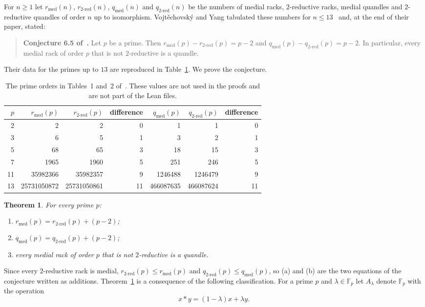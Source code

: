 \documentclass[11pt]{article}
\newtheorem{theorem}{Theorem}
\theoremstyle{definition}
\theoremstyle{remark}
\newcommand{\F}{\mathbb F}
\newcommand{\rmed}{r_{\mathrm{med}}}
\newcommand{\rred}{r_{\mathrm{2\text{-}red}}}
\newcommand{\qmed}{q_{\mathrm{med}}}
\newcommand{\qred}{q_{\mathrm{2\text{-}red}}}
\begin{document}
For $n\ge1$ let $\rmed(n)$, $\rred(n)$, $\qmed(n)$ and $\qred(n)$ be the
numbers of medial racks, $2$-reductive racks, medial quandles and
$2$-reductive quandles of order $n$ up to isomorphism. Vojt\v{e}chovsk\'y and
Yang tabulated these numbers for $n\le13$~\cite[Tables~1 and~2]{vy} and, at the
end of their paper, stated:

\begin{quote}
\textbf{Conjecture 6.5 of~\cite{vy}.} Let $p$ be a prime. Then
$\rmed(p)-\rred(p)=p-2$ and $\qmed(p)-\qred(p)=p-2$. In particular, every
medial rack of order $p$ that is not $2$-reductive is a quandle.
\end{quote}

\noindent Their data for the primes up to $13$ are reproduced in
Table~\ref{tab:data}. We prove the conjecture.

\begin{table}[ht]
\centering\small
\begin{tabular}{@{}rrrrrrr@{}}
\hline
$p$ & $\rmed(p)$ & $\rred(p)$ & difference & $\qmed(p)$ & $\qred(p)$ & difference\\
\hline
2 & 2 & 2 & 0 & 1 & 1 & 0\\
3 & 6 & 5 & 1 & 3 & 2 & 1\\
5 & 68 & 65 & 3 & 18 & 15 & 3\\
7 & 1965 & 1960 & 5 & 251 & 246 & 5\\
11 & 35982366 & 35982357 & 9 & 1246488 & 1246479 & 9\\
13 & 25731050872 & 25731050861 & 11 & 466087635 & 466087624 & 11\\
\hline
\end{tabular}
\caption{The prime orders in Tables~1 and~2 of~\cite{vy}. These values are
not used in the proofs and are not part of the Lean files.}
\label{tab:data}
\end{table}

\begin{theorem}\label{thm:main}
For every prime $p$:
\begin{enumerate}
\item[(a)] $\rmed(p)=\rred(p)+(p-2)$;
\item[(b)] $\qmed(p)=\qred(p)+(p-2)$;
\item[(c)] every medial rack of order $p$ that is not $2$-reductive is a
quandle.
\end{enumerate}
\end{theorem}

\noindent Since every $2$-reductive rack is medial, $\rred(p)\le\rmed(p)$ and
$\qred(p)\le\qmed(p)$, so (a) and (b) are the two equations of the conjecture
written as additions. Theorem~\ref{thm:main} is a consequence of the following
classification. For a prime $p$ and $\lambda\in\F_p$ let $A_\lambda$ denote
$\F_p$ with the operation
\[
x*y=(1-\lambda)x+\lambda y .
\]
\end{document}
